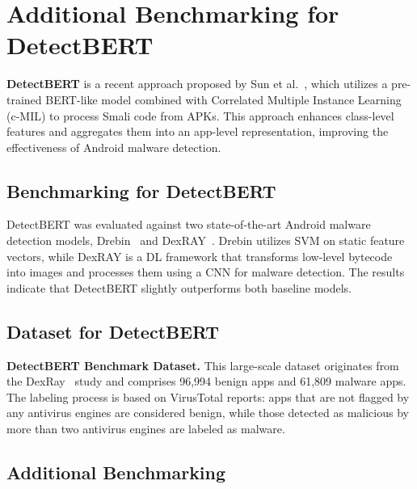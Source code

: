 \section{Additional Benchmarking for DetectBERT}

\textbf{DetectBERT} is a recent approach proposed by Sun et al.~\cite{Sun:esem24}, which utilizes a pre-trained BERT-like model combined with Correlated Multiple Instance Learning (c-MIL) to process Smali code from APKs. This approach enhances class-level features and aggregates them into an app-level representation, improving the effectiveness of Android malware detection. 

\subsection{Benchmarking for DetectBERT}
DetectBERT was evaluated against two state-of-the-art Android malware
detection models, Drebin~\cite{Arp:NDSS14} and
DexRAY~\cite{Nadia:MALHat21}. Drebin utilizes SVM on static feature
vectors, while DexRAY is a DL framework that transforms low-level
bytecode into images and processes them using a CNN for malware
detection. The results indicate that DetectBERT slightly outperforms
both baseline models.

\subsection{Dataset for DetectBERT}
\textbf{DetectBERT Benchmark Dataset.} This large-scale dataset originates from the DexRay~\cite{Nadia:MALHat21} study and comprises 96,994 benign apps and 61,809 malware apps. The labeling process is based on VirusTotal reports: apps that are not flagged by any antivirus engines are considered benign, while those detected as malicious by more than two antivirus engines are labeled as malware.  

\subsection{Additional Benchmarking}

